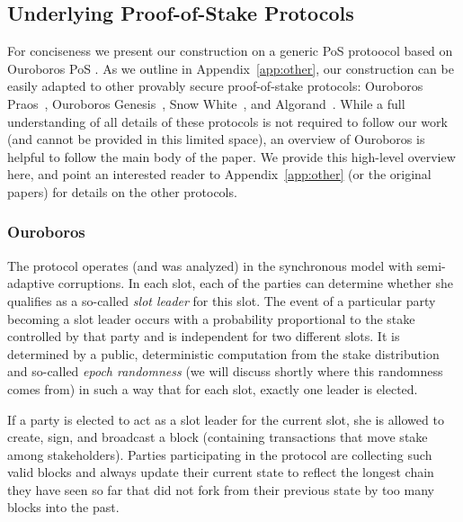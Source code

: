 \subsection{Underlying Proof-of-Stake Protocols}
\label{sec:ouroboros}
\label{sec:pos}

For conciseness we present our construction on a generic PoS protoocol
 based on  Ouroboros PoS \cite{C:KRDO17}. As we outline
in Appendix~\ref{app:other}, our construction can  be easily adapted to other
provably secure proof-of-stake protocols: Ouroboros
Praos~\cite{EC:DGKR18}, Ouroboros Genesis~\cite{genesis}, Snow
White~\cite{DBLP:journals/iacr/BentovPS16a}, and Algorand~\cite{algorand}.
While a full understanding of all details of these protocols is not required to
follow our work (and cannot be provided in this limited space), an overview of
Ouroboros is helpful to follow the main body of the paper.  We provide this
high-level overview here, and point an interested reader to
Appendix~\ref{app:other} (or the original papers) for details on the other
protocols.

\subsubsection{Ouroboros}

The protocol operates (and was analyzed) in the synchronous model with
semi-adaptive corruptions. %
%
In each slot, each of the parties can determine whether she qualifies as a
so-called \emph{slot leader} for this slot.  The event of a particular party
becoming a slot leader occurs with a probability proportional to the stake
controlled by that party and  is independent for two different slots.
It is determined by a public, deterministic computation from the stake
distribution and so-called \emph{epoch randomness} (we will discuss shortly
where this randomness comes from) in such a way that for each slot, exactly one
leader is elected.

If a party is elected to act as a slot leader for the current slot, she is
allowed to create, sign, and broadcast a block (containing transactions that
move stake among stakeholders).  Parties participating in the protocol are
collecting such valid blocks and always update their current state to reflect
the longest chain they have seen so far that did not fork from their previous
state by too many blocks into the past.

